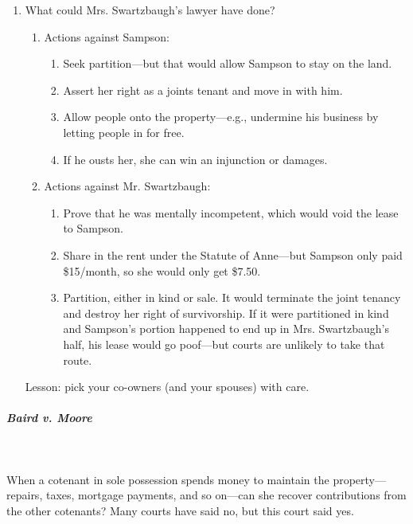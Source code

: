 \begin{enumerate}
    existing contracts giving to Sampson the same right to the possession of 
    the leased property that Swartzbaugh had. It follows that they cannot be 
    cancelled by plaintiff in this action.''\footnote{Casebook p. 354.}
    \item What could Mrs. Swartzbaugh's lawyer have done?
    \begin{enumerate}
        \item Actions against Sampson:
        \begin{enumerate}
            \item Seek partition---but that would allow Sampson to stay on the 
            land.
            \item Assert her right as a joints tenant and move in with him.
            \item Allow people onto the property---e.g., undermine his 
            business by letting people in for free.
            \item If he ousts her, she can win an injunction or damages.
        \end{enumerate}
        \item Actions against Mr. Swartzbaugh:
        \begin{enumerate}
            \item Prove that he was mentally incompetent, which would void the 
            lease to Sampson.
            \item Share in the rent under the Statute of Anne---but Sampson 
            only paid \$15/month, so she would only get \$7.50.
            \item Partition, either in kind or sale. It would terminate the 
            joint tenancy and destroy her right of survivorship. If it were 
            partitioned in kind and Sampson's portion happened to end up in 
            Mrs. Swartzbaugh's half, his lease would go poof---but courts are 
            unlikely to take that route.
        \end{enumerate}
    \end{enumerate}
    Lesson: pick your co-owners (and your spouses) with care.
\end{enumerate}

\paragraph{\emph{Baird v. Moore}}
~\\\\When a cotenant in sole possession spends money to maintain the 
property---repairs, taxes, mortgage payments, and so on---can she recover 
contributions from the other cotenants? Many courts have said no, but this 
court said yes.

